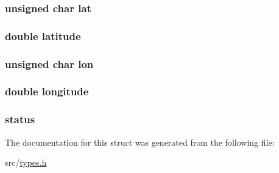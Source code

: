 \subsubsection[{\texorpdfstring{lat}{lat}}]{\setlength{\rightskip}{0pt plus 5cm}unsigned char lat}\hypertarget{structgll_a6a2e4ad53afd61fcd716002fc2965220}{}\label{structgll_a6a2e4ad53afd61fcd716002fc2965220}
\subsubsection[{\texorpdfstring{latitude}{latitude}}]{\setlength{\rightskip}{0pt plus 5cm}double latitude}\hypertarget{structgll_a76714bdbc5c536fa77dfb14533ff82a9}{}\label{structgll_a76714bdbc5c536fa77dfb14533ff82a9}
\subsubsection[{\texorpdfstring{lon}{lon}}]{\setlength{\rightskip}{0pt plus 5cm}unsigned char lon}\hypertarget{structgll_a7e55b80071251dcef4239e60122980a4}{}\label{structgll_a7e55b80071251dcef4239e60122980a4}
\subsubsection[{\texorpdfstring{longitude}{longitude}}]{\setlength{\rightskip}{0pt plus 5cm}double longitude}\hypertarget{structgll_ac155e35fdeebafc89723a51520fb9fe6}{}\label{structgll_ac155e35fdeebafc89723a51520fb9fe6}
\subsubsection[{\texorpdfstring{status}{status}}]{ status}\hypertarget{structgll_ad1f0bff7112206922c9d5a87adad6f2b}{}\label{structgll_ad1f0bff7112206922c9d5a87adad6f2b}


The documentation for this struct was generated from the following file\+:\begin{DoxyCompactItemize}
\item 
src/\hyperlink{types_8h}{types.\+h}\end{DoxyCompactItemize}
